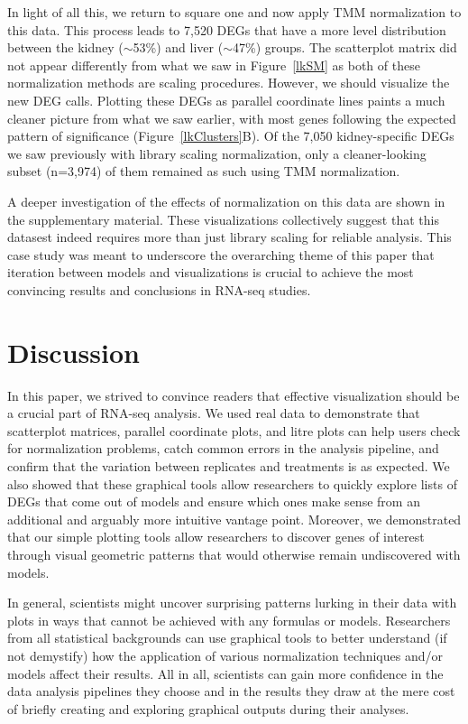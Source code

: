 \documentclass[11pt,a4paper,oldfontcommands,openany]{memoir}
\numberwithin{equation}{section} %
\begin{document}
In light of all this, we return to square one and now apply TMM normalization to this data. This process leads to 7,520 DEGs that have a more level distribution between the kidney ($\sim$53\%) and liver ($\sim$47\%) groups. The scatterplot matrix did not appear differently from what we saw in Figure~\ref{lkSM} as both of these normalization methods are scaling procedures. However, we should visualize the new DEG calls. Plotting these DEGs as parallel coordinate lines paints a much cleaner picture from what we saw earlier, with most genes following the expected pattern of significance (Figure~\ref{lkClusters}B). Of the 7,050 kidney-specific DEGs we saw previously with library scaling normalization, only a cleaner-looking subset (n=3,974) of them remained as such using TMM normalization.

A deeper investigation of the effects of normalization on this data are shown in the supplementary material. These visualizations collectively suggest that this datasest indeed requires more than just library scaling for reliable analysis. This case study was meant to underscore the overarching theme of this paper that iteration between models and visualizations is crucial to achieve the most convincing results and conclusions in RNA-seq studies.

\section{Discussion}

In this paper, we strived to convince readers that effective visualization should be a crucial part of RNA-seq analysis. We used real data to demonstrate that scatterplot matrices, parallel coordinate plots, and litre plots can help users check for normalization problems, catch common errors in the analysis pipeline, and confirm that the variation between replicates and treatments is as expected. We also showed that these graphical tools allow researchers to quickly explore lists of DEGs that come out of models and ensure which ones make sense from an additional and arguably more intuitive vantage point. Moreover, we demonstrated that our simple plotting tools allow researchers to discover genes of interest through visual geometric patterns that would otherwise remain undiscovered with models.

In general, scientists might uncover surprising patterns lurking in their data with plots in ways that cannot be achieved with any formulas or models. Researchers from all statistical backgrounds can use graphical tools to better understand (if not demystify) how the application of various normalization techniques and/or models affect their results. All in all, scientists can gain more confidence in the data analysis pipelines they choose and in the results they draw at the mere cost of briefly creating and exploring graphical outputs during their analyses.
\end{document}
